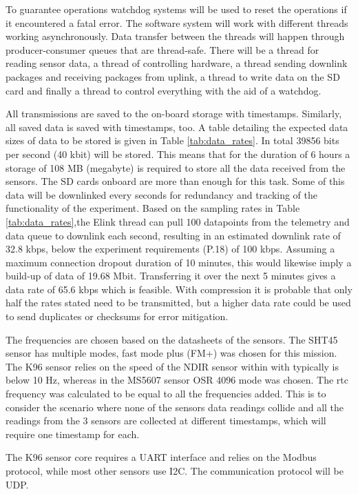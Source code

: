 \documentclass[
  a4paper,
  11pt,
  openany,
  parskip,
  toc=totoc,
  listof=totoc,
  bibliography=totoc
]{scrreprt}
\begin{document}
To guarantee operations watchdog systems will be used to reset the operations if it encountered a fatal error.
The software system will work with different threads working asynchronously.
Data transfer between the threads will happen through producer-consumer queues that are thread-safe.
There will be a thread for reading sensor data, a thread of controlling hardware, a thread sending downlink packages and receiving packages from uplink, a thread to write data on the SD card and finally a thread to control everything with the aid of a watchdog.

All transmissions are saved to the on-board storage with timestamps. Similarly, all saved data is saved with timestamps, too. A table detailing the expected data sizes of data to be stored is given in Table \ref{tab:data_rates}. In total 39856 bits per second (40 kbit) will be stored. This means that for the duration of 6 hours a storage of 108 MB (megabyte) is required to store all the data received from the sensors. The SD cards onboard are more than enough for this task. Some of this data will be downlinked every seconds for redundancy and tracking of the functionality of the experiment. Based on the sampling rates in Table \ref{tab:data_rates},the Elink thread can pull 100 datapoints from the telemetry and data queue to downlink each second, resulting in an estimated downlink rate of 32.8 kbps, below the experiment requirements (P.18) of 100 kbps. Assuming a maximum connection dropout duration of 10 minutes, this would likewise imply a build-up of data of 19.68 Mbit. Transferring it over the next 5 minutes gives a data rate of 65.6 kbps which is feasible. With compression it is probable that only half the rates stated need to be transmitted, but a higher data rate could be used to send duplicates or checksums for error mitigation.

The frequencies are chosen based on the datasheets of the sensors. The SHT45 sensor has multiple modes, fast mode plus (FM+) was chosen for this mission. The K96 sensor relies on the speed of the NDIR sensor within with typically is below 10 Hz, whereas in the MS5607 sensor OSR 4096 mode was chosen. The \gls{rtc} frequency was calculated to be equal to all the frequencies added. This is to consider the scenario where none of the sensors data readings collide and all the readings from the 3 sensors are collected at different timestamps, which will require one timestamp for each.

The K96 sensor core requires a UART interface and relies on the Modbus protocol, while most other sensors use I2C. The communication protocol will be UDP.
\end{document}
